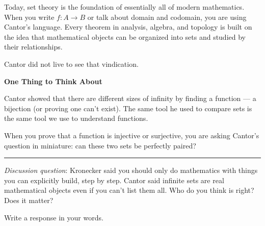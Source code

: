 \documentclass[12pt]{article}
\begin{document}
Today, set theory is the foundation of essentially all of modern mathematics.
When you write $f \colon A \to B$ or talk about domain and codomain,
you are using Cantor's language. Every theorem in analysis, algebra, and topology
is built on the idea that mathematical objects can be organized into sets and
studied by their relationships.

Cantor did not live to see that vindication.

\bigskip
\noindent\textbf{One Thing to Think About}

Cantor showed that there are different sizes of infinity by finding a function ---
a bijection (or proving one can't exist). The same tool he used to compare sets
is the same tool we use to understand functions.

When you prove that a function is injective or surjective, you are asking Cantor's
question in miniature: can these two sets be perfectly paired?

\bigskip
\hrule\bigskip
\noindent \textit{Discussion question}: Kronecker said you should only
do mathematics with things you can explicitly build, step by step.
Cantor said infinite sets are real mathematical objects even if you can't list them all.
Who do you think is right? Does it matter?

\bigskip

Write a response in your words. 
\end{document}

